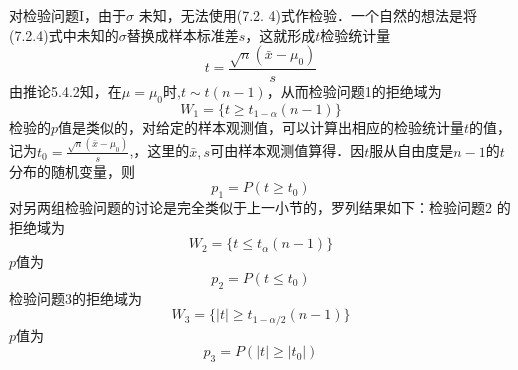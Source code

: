 对检验问题I，由于$\sigma$ 未知，无法使用(7.2. 4)式作检验．一个自然的想法是将(7.2.4)式中未知的$\sigma$替换成样本标准差$s$，这就形成$t$检验统计量
\begin{equation}
    t = \frac{\sqrt{n}(\bar{x}-\mu_0)}{s}
\end{equation}
由推论5.4.2知，在$\mu=\mu_0$时,$t\sim t(n-1)$，从而检验问题1的拒绝域为
\begin{equation}
    W_1 = \{t \geqslant t_{1-\alpha}(n-1)\}
\end{equation}
检验的$p$值是类似的，对给定的样本观测值，可以计算出相应的检验统计量$t$的值，记为$t_0=\frac{\sqrt{n}(\bar{x}-\mu_0)}{s}$,，这里的$\bar{x},s$可由样本观测值算得．因$t$服从自由度是$n-1$的$t$分布的随机变量，则
\begin{equation}
    p_1 = P(t \geqslant t_0)
\end{equation}
对另两组检验问题的讨论是完全类似于上一小节的，罗列结果如下：检验问题2
的拒绝域为
\begin{equation}
    W_2 = \{t \leqslant t_{\alpha}(n-1)\}
\end{equation}
$p$值为
\begin{equation}
    p_2 = P(t \leqslant t_0)
\end{equation}
检验问题3的拒绝域为
\begin{equation}
    W_3 = \{|t| \geqslant t_{1-\alpha/2}(n-1)\}
\end{equation}
$p$值为
\begin{equation}
    p_3 = P(|t| \geqslant |t_0|)
\end{equation}



